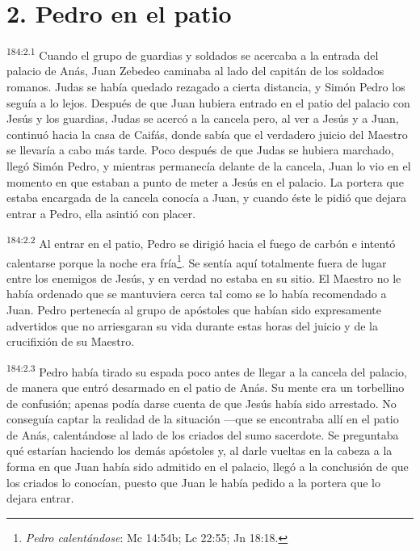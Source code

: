 \section*{2. Pedro en el patio}
\par
\textsuperscript{184:2.1} Cuando el grupo de guardias y soldados se acercaba a la entrada del palacio de Anás, Juan Zebedeo caminaba al lado del capitán de los soldados romanos. Judas se había quedado rezagado a cierta distancia, y Simón Pedro los seguía a lo lejos. Después de que Juan hubiera entrado en el patio del palacio con Jesús y los guardias, Judas se acercó a la cancela pero, al ver a Jesús y a Juan, continuó hacia la casa de Caifás, donde sabía que el verdadero juicio del Maestro se llevaría a cabo más tarde. Poco después de que Judas se hubiera marchado, llegó Simón Pedro, y mientras permanecía delante de la cancela, Juan lo vio en el momento en que estaban a punto de meter a Jesús en el palacio. La portera que estaba encargada de la cancela conocía a Juan, y cuando éste le pidió que dejara entrar a Pedro, ella asintió con placer.

\par
\textsuperscript{184:2.2} Al entrar en el patio, Pedro se dirigió hacia el fuego de carbón e intentó calentarse porque la noche era fría\footnote{\textit{Pedro calentándose}: Mc 14:54b; Lc 22:55; Jn 18:18.}. Se sentía aquí totalmente fuera de lugar entre los enemigos de Jesús, y en verdad no estaba en su sitio. El Maestro no le había ordenado que se mantuviera cerca tal como se lo había recomendado a Juan. Pedro pertenecía al grupo de apóstoles que habían sido expresamente advertidos que no arriesgaran su vida durante estas horas del juicio y de la crucifixión de su Maestro.

\par
\textsuperscript{184:2.3} Pedro había tirado su espada poco antes de llegar a la cancela del palacio, de manera que entró desarmado en el patio de Anás. Su mente era un torbellino de confusión; apenas podía darse cuenta de que Jesús había sido arrestado. No conseguía captar la realidad de la situación ---que se encontraba allí en el patio de Anás, calentándose al lado de los criados del sumo sacerdote. Se preguntaba qué estarían haciendo los demás apóstoles y, al darle vueltas en la cabeza a la forma en que Juan había sido admitido en el palacio, llegó a la conclusión de que los criados lo conocían, puesto que Juan le había pedido a la portera que lo dejara entrar.

